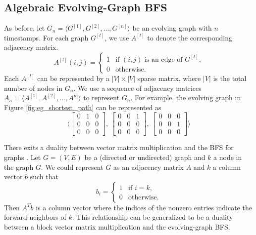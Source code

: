 \documentclass[11pt, conference, , compsocconf]{IEEEtran}
\theoremstyle{definition}
\begin{document}
\subsection{Algebraic Evolving-Graph BFS}
\label{sec:representation}
As before, let $G_n = \langle G^{[1]}, G^{[2]}, \ldots, G^{[n]}\rangle$ be an evolving graph with $n$ timestamps. For each graph $G^{[t]}$, we use $A^{[t]}$ to denote
the corresponding adjacency matrix.
\[
A^{[t]}(i,j) = 
\begin{cases}
 1 & \mbox{if $(i,j)$ is an edge of $G^{[t]}$,} \\
 0 & \mbox{otherwise.}
\end{cases}
\]
 Each $A^{[t]}$ can be represented by 
a $|V|\times |V|$ sparse matrix,
where $|V|$ is the total number of nodes in $G_n$.
We use a sequence of adjacency matrices $A_n = \langle A^{[1]}, A^{[2]}, \ldots, A^{n]}\rangle$ to represent $G_n$. 
For example, the evolving graph in Figure \ref{fig:eg_shortest_path}
can be represented as 
\[
\Big\langle
  \begin{bmatrix} 
    0 & 1 & 0 \\
    0 & 0 & 0 \\
    0 & 0 & 0
  \end{bmatrix},~
 \begin{bmatrix}
   0 & 0 & 1 \\
   0 & 0 & 0 \\
   0 & 0 & 0 
 \end{bmatrix},~
 \begin{bmatrix}
  0 & 0 & 0 \\
  0 & 0 & 1 \\
  0 & 0 & 0 
 \end{bmatrix}
\Big\rangle
\]



There exits a duality between vector matrix multiplication and the BFS
for graphs \cite{kegi11}. Let $G = (V, E)$ be a (directed or undirected) graph
and $k$ a node in the graph $G$. We could represent $G$ as an adjacency 
matrix $A$ and $k$ a column vector $b$ such that 
\[
b_i = 
\begin{cases}
1 & \mbox{if $i = k$,} \\
0 & \mbox{otherwise.}
\end{cases}
\]
Then $A^Tb$ is a column vector where the indices of the nonzero entries 
indicate the forward-neighbors of $k$. This relationship can be generalized to be
a duality between a block vector matrix multiplication and the 
evolving-graph BFS.
\end{document}
